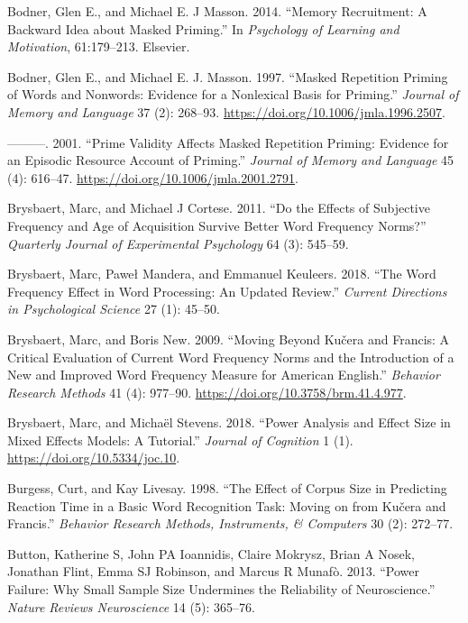 \documentclass[
]{interact}
\newlength{\cslhangindent}
\newenvironment{CSLReferences}[2] %
 {\begin{list}{}{%
  \setlength{\itemindent}{0pt}
  \setlength{\leftmargin}{0pt}
  \setlength{\parsep}{0pt}
  \ifodd #1
   \setlength{\leftmargin}{\cslhangindent}
   \setlength{\itemindent}{-1\cslhangindent}
  \fi
  \setlength{\itemsep}{#2\baselineskip}}}
 {\end{list}}
\begin{document}
\begin{CSLReferences}{1}{0}
Bodner, Glen E., and Michael E. J Masson. 2014. {``Memory Recruitment: A
Backward Idea about Masked Priming.''} In \emph{Psychology of Learning
and Motivation}, 61:179--213. Elsevier.

Bodner, Glen E., and Michael E. J. Masson. 1997. {``Masked Repetition
Priming of Words and Nonwords: Evidence for a Nonlexical Basis for
Priming.''} \emph{Journal of Memory and Language} 37 (2): 268--93.
\url{https://doi.org/10.1006/jmla.1996.2507}.

---------. 2001. {``Prime Validity Affects Masked Repetition Priming:
Evidence for an Episodic Resource Account of Priming.''} \emph{Journal
of Memory and Language} 45 (4): 616--47.
\url{https://doi.org/10.1006/jmla.2001.2791}.

Brysbaert, Marc, and Michael J Cortese. 2011. {``Do the Effects of
Subjective Frequency and Age of Acquisition Survive Better Word
Frequency Norms?''} \emph{Quarterly Journal of Experimental Psychology}
64 (3): 545--59.

Brysbaert, Marc, Paweł Mandera, and Emmanuel Keuleers. 2018. {``The Word
Frequency Effect in Word Processing: An Updated Review.''} \emph{Current
Directions in Psychological Science} 27 (1): 45--50.

Brysbaert, Marc, and Boris New. 2009. {``Moving Beyond Ku{č}era and
Francis: A Critical Evaluation of Current Word Frequency Norms and the
Introduction of a New and Improved Word Frequency Measure for American
English.''} \emph{Behavior Research Methods} 41 (4): 977--90.
\url{https://doi.org/10.3758/brm.41.4.977}.

Brysbaert, Marc, and Michaël Stevens. 2018. {``Power Analysis and Effect
Size in Mixed Effects Models: A Tutorial.''} \emph{Journal of Cognition}
1 (1). \url{https://doi.org/10.5334/joc.10}.

Burgess, Curt, and Kay Livesay. 1998. {``The Effect of Corpus Size in
Predicting Reaction Time in a Basic Word Recognition Task: Moving on
from Ku{č}era and Francis.''} \emph{Behavior Research Methods,
Instruments, \& Computers} 30 (2): 272--77.

Button, Katherine S, John PA Ioannidis, Claire Mokrysz, Brian A Nosek,
Jonathan Flint, Emma SJ Robinson, and Marcus R Munafò. 2013. {``Power
Failure: Why Small Sample Size Undermines the Reliability of
Neuroscience.''} \emph{Nature Reviews Neuroscience} 14 (5): 365--76.


\end{CSLReferences}
\end{document}
